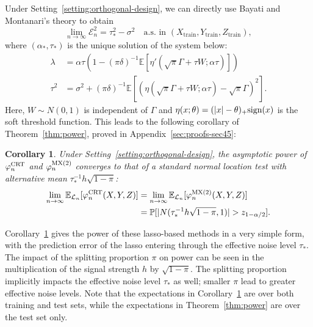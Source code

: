 \documentclass[12pt]{article}
\newtheorem{corollary}{Corollary}
\theoremstyle{definition}
\theoremstyle{remark}
\newcommand{\srx}{X}
\newcommand{\srz}{Z}
\newcommand{\sry}{Y}
\begin{document}
Under Setting~\ref{setting:orthogonal-design}, we can directly use Bayati and Montanari's theory \cite{Bayati2011} to obtain 
\begin{equation}
\lim_{n \rightarrow \infty}\mathcal E_n^2 = \tau_*^2 - \sigma^2 \quad \text{a.s. in } (\srx_{\text{train}}, \sry_{\text{train}}, \srz_{\text{train}}),
\label{eq:bm-result}
\end{equation}
where $(\alpha_*,\tau_*)$ is the unique solution of the system below:
\begin{equation}
	\begin{split}
		\lambda &= \alpha \tau (1-(\pi\delta)^{-1}\mathbb E[\eta'(\sqrt \pi \Gamma + \tau W; \alpha \tau)]) \\
		\tau^2 &= \sigma^2 + (\pi\delta)^{-1}\mathbb E[(\eta(\sqrt \pi\Gamma + \tau W; \alpha \tau) - \sqrt \pi\Gamma)^2].
	\end{split}
	\label{eq:amp-system}
\end{equation}
Here, $W \sim N(0,1)$ is independent of $\Gamma$ and $\eta(x; \theta) = (|x|-\theta)_+\textnormal{sign}(x)$ is the soft threshold function. This leads to the following corollary of Theorem~\ref{thm:power}, proved in Appendix~\ref{sec:proofs-sec45}:
\begin{corollary} \label{cor:lasso}
Under Setting~\ref{setting:orthogonal-design}, the asymptotic power of $\varphi^{\textnormal{CRT}}_{n}$ and $\varphi^{\textnormal{MX(2)}}_{n}$ converges to that of a standard normal location test with alternative mean $\tau_*^{-1} h\sqrt{1-\pi}$:
\begin{equation}
	\begin{split}
	\lim_{n \rightarrow \infty}\mathbb E_{\mathcal L_n}[\varphi^{\textnormal{CRT}}_{n}(\srx, \sry, \srz)] &= \lim_{n \rightarrow \infty}\mathbb E_{\mathcal L_n}[\varphi^{\textnormal{MX(2)}}_{n}(\srx, \sry, \srz)] \\
	&=  \mathbb P[|N(\tau_*^{-1} h\sqrt{1-\pi},1)| > z_{1-\alpha/2}].
	\label{eq:lasso-power}
	\end{split}
\end{equation}
\end{corollary}
Corollary~\ref{cor:lasso} gives the power of these lasso-based methods in a very simple form, with the prediction error of the lasso entering through the effective noise level $\tau_*$. The impact of the splitting proportion $\pi$ on power can be seen in the multiplication of the signal strength $h$ by $\sqrt{1-\pi}$. The splitting proportion implicitly impacts the effective noise level $\tau_*$ as well; smaller $\pi$ lead to greater effective noise levels. Note that the expectations in Corollary~\ref{cor:lasso} are over both training and test sets, while the expectations in Theorem~\ref{thm:power} are over the test set only. 
\end{document}
